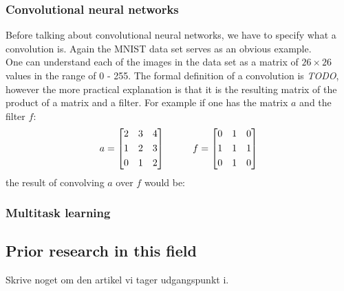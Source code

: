 
\subsubsection{Convolutional neural networks}
Before talking about convolutional neural networks, we have to specify what a convolution is. Again the MNIST data set serves as an obvious example.\\
One can understand each of the images in the data set as a matrix of $26\times26$ values in the range of 0 - 255. The formal definition of a convolution is \emph{TODO}, however the more practical explanation is that it is the resulting matrix of the product of a matrix and a filter. For example if one has the matrix $a$ and the filter $f$:
\[
a = \begin{bmatrix}
       2 & 3 & 4           \\[0.3em]
       1 & 2 & 3 \\[0.3em]
       0 & 1 & 2
     \end{bmatrix}
\hspace*{1cm}
f = \begin{bmatrix}
       0 & 1 & 0           \\[0.3em]
       1 & 1 & 1 \\[0.3em]
       0 & 1 & 0
     \end{bmatrix}     
\]
the result of convolving $a$ over $f$ would be:
\subsubsection{Multitask learning}

\subsection{Prior research in this field}
Skrive noget om den artikel vi tager udgangspunkt i.











